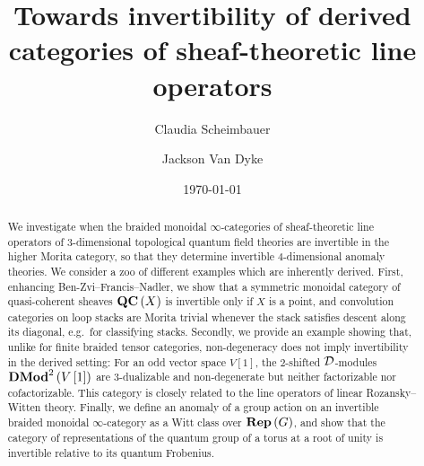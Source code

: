 \documentclass{amsart}
\begin{document}
\title[Invertibility of sheaf-theoretic line operators]{Towards invertibility of derived categories of sheaf-theoretic line operators}

\author{Claudia Scheimbauer}
\author{Jackson Van Dyke}
\address{TU Munich, Boltzmannstr. 3, 85746 Garching}

\date{\today}

\begin{abstract}
We investigate when the braided monoidal $\infty$-categories of sheaf-theoretic line operators of $3$-dimensional topological quantum field theories are invertible
in the higher Morita category, so that they determine invertible $4$-dimensional anomaly theories.
We consider a zoo of different examples which are inherently derived.
First, enhancing Ben-Zvi--Francis--Nadler, we show that a symmetric monoidal category of quasi-coherent sheaves $\mathbf{QC}\left(X\right)$ is invertible only if $X$ is a point, and convolution categories on loop stacks are Morita trivial whenever the stack satisfies descent along its diagonal, e.g.\ for classifying stacks.
Secondly, we provide an example showing that, unlike for finite braided tensor categories,
non-degeneracy does not imply invertibility in the derived setting: For an odd vector space
$V\left[1\right]$, the $2$-shifted $\mathcal{D}$-modules $\mathbf{DMod}^2\left(V\left[1\right]\right)$ are $3$-dualizable and non-degenerate
but neither factorizable nor cofactorizable.
This category is closely related to the line operators of linear Rozansky--Witten theory.
Finally, we define an anomaly of a group action on
an invertible braided monoidal $\infty$-category as a Witt class over $\mathbf{Rep}\left(G\right)$, and show that the category of representations of the quantum group of
a torus at a root of unity is invertible relative to its quantum Frobenius.
\end{abstract}

\maketitle

\tableofcontents











\end{document}
